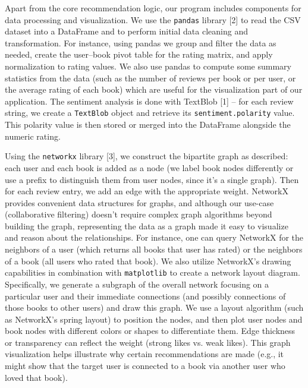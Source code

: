 \documentclass[11pt]{article}
\begin{document}
Apart from the core recommendation logic, our program includes components for data processing and visualization. We use the \texttt{pandas} library [2] to read the CSV dataset into a DataFrame and to perform initial data cleaning and transformation. For instance, using pandas we group and filter the data as needed, create the user–book pivot table for the rating matrix, and apply normalization to rating values. We also use pandas to compute some summary statistics from the data (such as the number of reviews per book or per user, or the average rating of each book) which are useful for the visualization part of our application. The sentiment analysis is done with TextBlob [1] – for each review string, we create a \texttt{TextBlob} object and retrieve its \texttt{sentiment.polarity} value. This polarity value is then stored or merged into the DataFrame alongside the numeric rating.

Using the \texttt{networkx} library [3], we construct the bipartite graph as described: each user and each book is added as a node (we label book nodes differently or use a prefix to distinguish them from user nodes, since it’s a single graph). Then for each review entry, we add an edge with the appropriate weight. NetworkX provides convenient data structures for graphs, and although our use-case (collaborative filtering) doesn’t require complex graph algorithms beyond building the graph, representing the data as a graph made it easy to visualize and reason about the relationships. For instance, one can query NetworkX for the neighbors of a user (which returns all books that user has rated) or the neighbors of a book (all users who rated that book). We also utilize NetworkX’s drawing capabilities in combination with \texttt{matplotlib} to create a network layout diagram. Specifically, we generate a subgraph of the overall network focusing on a particular user and their immediate connections (and possibly connections of those books to other users) and draw this graph. We use a layout algorithm (such as NetworkX’s spring layout) to position the nodes, and then plot user nodes and book nodes with different colors or shapes to differentiate them. Edge thickness or transparency can reflect the weight (strong likes vs. weak likes). This graph visualization helps illustrate why certain recommendations are made (e.g., it might show that the target user is connected to a book via another user who loved that book).
\end{document}
